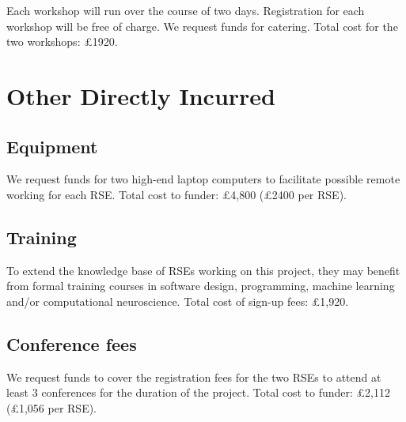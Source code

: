 \documentclass[a4paper,11pt]{article}
\begin{document}
Each workshop will run over the course of two days. Registration for each workshop will be free of charge. We request funds for catering. Total cost for the two workshops: £1920.

\section{Other Directly Incurred} 

\subsection*{Equipment}

We request funds for two high-end laptop computers to facilitate possible remote working for each RSE. Total cost to funder: £4,800 (£2400 per RSE).  

\subsection*{Training}

To extend the knowledge base of RSEs working on this project, they may benefit from formal training courses in software design, programming, machine learning and/or computational neuroscience. Total cost of sign-up fees: £1,920. 

\subsection*{Conference fees}

We request funds to cover the registration fees for the two RSEs to attend at least 3 conferences for the duration of the project.  
Total cost to funder: £2,112 (£1,056 per RSE). 
\end{document}
